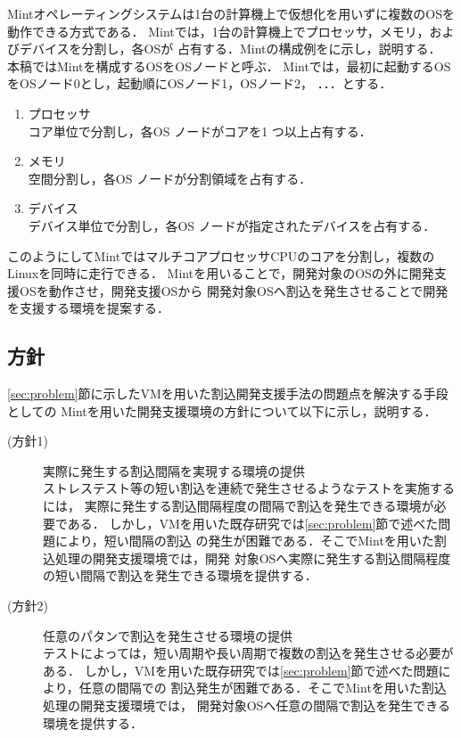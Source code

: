 \documentclass[submit,techreq,noauthor,dvipdfmx]{ipsj}
\begin{document}

Mintオペレーティングシステムは1台の計算機上で仮想化を用いずに複数のOSを動作できる方式である．
Mintでは，1台の計算機上でプロセッサ，メモリ，およびデバイスを分割し，各OSが
占有する．Mintの構成例をに示し，説明する．
本稿ではMintを構成するOSをOSノードと呼ぶ．
Mintでは，最初に起動するOSをOSノード0とし，起動順にOSノード1，OSノード2，
．．．とする．

\begin{enumerate}
    \item プロセッサ\\
        コア単位で分割し，各OS ノードがコアを1 つ以上占有する．
    \item メモリ\\
        空間分割し，各OS ノードが分割領域を占有する．
    \item デバイス\\
        デバイス単位で分割し，各OS ノードが指定されたデバイスを占有する．
\end{enumerate}

このようにしてMintではマルチコアプロセッサCPUのコアを分割し，複数のLinuxを同時に走行できる．
Mintを用いることで，開発対象のOSの外に開発支援OSを動作させ，開発支援OSから
開発対象OSへ割込を発生させることで開発を支援する環境を提案する．

\subsection{方針}\label{sec:policy}

\ref{sec:problem}節に示したVMを用いた割込開発支援手法の問題点を解決する手段としての
Mintを用いた開発支援環境の方針について以下に示し，説明する．
\begin{description}
    \item[(方針1)] 実際に発生する割込間隔を実現する環境の提供\\
        ストレステスト等の短い割込を連続で発生させるようなテストを実施するには，
        実際に発生する割込間隔程度の間隔で割込を発生できる環境が必要である．
        しかし，VMを用いた既存研究では\ref{sec:problem}節で述べた問題により，短い間隔の割込
        の発生が困難である．そこでMintを用いた割込処理の開発支援環境では，開発
        対象OSへ実際に発生する割込間隔程度の短い間隔で割込を発生できる環境を提供する．
    \item[(方針2)] 任意のパタンで割込を発生させる環境の提供\\
        テストによっては，短い周期や長い周期で複数の割込を発生させる必要がある．
        しかし，VMを用いた既存研究では\ref{sec:problem}節で述べた問題により，任意の間隔での
        割込発生が困難である．そこでMintを用いた割込処理の開発支援環境では，
        開発対象OSへ任意の間隔で割込を発生できる環境を提供する．
\end{description}
\end{document}
